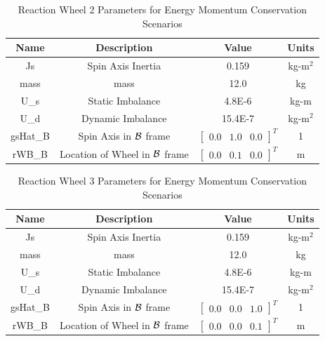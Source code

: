 \begin{table}[htbp]
	\caption{Reaction Wheel 2 Parameters for Energy Momentum Conservation Scenarios}
	\label{tab:rw2}
	\centering \fontsize{10}{10}\selectfont
	\begin{tabular}{ c | c | c | c } %
		\hline
		\textbf{Name}  & \textbf{Description}  & \textbf{Value} & \textbf{Units} \\
		\hline
		Js  & Spin Axis Inertia & 0.159 & kg-m$^2$ \\
		mass & mass & 12.0 & kg \\
		U\_s & Static Imbalance & 4.8E-6 & kg-m \\
		U\_d & Dynamic Imbalance & 15.4E-7 & kg-m$^2$ \\
		gsHat\_B & Spin Axis in $\cal{B}$ frame & $\begin{bmatrix}
		0.0 & 1.0 & 0.0 \end{bmatrix}^T$ & 1 \\
		rWB\_B & Location of Wheel in $\cal{B}$ frame & $\begin{bmatrix}
		0.0 & 0.1 & 0.0 \end{bmatrix}^T$ & m \\
		\hline
	\end{tabular}
\end{table}

\begin{table}[htbp]
	\caption{Reaction Wheel 3 Parameters for Energy Momentum Conservation Scenarios}
	\label{tab:rw3}
	\centering \fontsize{10}{10}\selectfont
	\begin{tabular}{ c | c | c | c } %
		\hline
		\textbf{Name}  & \textbf{Description}  & \textbf{Value} & \textbf{Units} \\
		\hline
		Js  & Spin Axis Inertia & 0.159 & kg-m$^2$ \\
		mass & mass & 12.0 & kg \\
		U\_s & Static Imbalance & 4.8E-6 & kg-m \\
		U\_d & Dynamic Imbalance & 15.4E-7 & kg-m$^2$ \\
		gsHat\_B & Spin Axis in $\cal{B}$ frame & $\begin{bmatrix}
		0.0 & 0.0 & 1.0 \end{bmatrix}^T$ & 1 \\
		rWB\_B & Location of Wheel in $\cal{B}$ frame & $\begin{bmatrix}
		0.0 & 0.0 & 0.1 \end{bmatrix}^T$ & m \\
		\hline
	\end{tabular}
\end{table}

